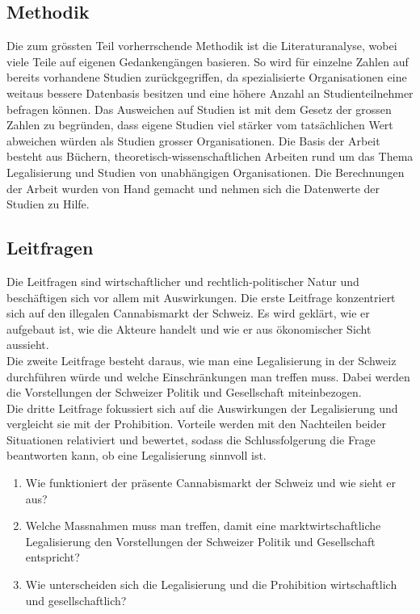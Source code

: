 \documentclass[../main.tex]{subfiles}
\begin{document}
	 
	 \subsection{Methodik}
	 Die zum grössten Teil vorherrschende Methodik ist die Literaturanalyse, wobei viele Teile auf eigenen Gedankengängen basieren. 
	 So wird für einzelne Zahlen auf bereits vorhandene Studien zurückgegriffen, da spezialisierte Organisationen eine weitaus bessere Datenbasis besitzen und eine höhere Anzahl an Studienteilnehmer befragen können. 
	 Das Ausweichen auf Studien ist mit dem Gesetz der grossen Zahlen zu begründen, dass eigene Studien viel stärker vom tatsächlichen Wert abweichen würden als Studien grosser Organisationen.
	 Die Basis der Arbeit besteht aus Büchern, theoretisch-wissenschaftlichen Arbeiten rund um das Thema Legalisierung und Studien von unabhängigen Organisationen.
	 Die Berechnungen der Arbeit wurden von Hand gemacht und nehmen sich die Datenwerte der Studien zu Hilfe.
	 
	 \subsection{Leitfragen}
	 Die Leitfragen sind wirtschaftlicher und rechtlich-politischer Natur und beschäftigen sich vor allem mit Auswirkungen.
	 Die erste Leitfrage konzentriert sich auf den illegalen Cannabismarkt der Schweiz.
	 Es wird geklärt, wie er aufgebaut ist, wie die Akteure handelt und wie er aus ökonomischer Sicht aussieht.\\
	 
	 \noindent
	 Die zweite Leitfrage besteht daraus, wie man eine Legalisierung in der Schweiz durchführen würde und welche Einschränkungen man treffen muss.
	 Dabei werden die Vorstellungen der Schweizer Politik und Gesellschaft miteinbezogen.\\
	 
	 \noindent
	 Die dritte Leitfrage fokussiert sich auf die Auswirkungen der Legalisierung und vergleicht sie mit der Prohibition. 
	 Vorteile werden mit den Nachteilen beider Situationen relativiert und bewertet, sodass die Schlussfolgerung die Frage beantworten kann, ob eine Legalisierung sinnvoll ist.

	 
	 \begin{enumerate}
	 	\item Wie funktioniert der präsente Cannabismarkt der Schweiz und wie sieht er aus?
	 	 
	 	\item Welche Massnahmen muss man treffen, damit eine marktwirtschaftliche Legalisierung den Vorstellungen der Schweizer Politik und Gesellschaft entspricht?
	 
	 	\item Wie unterscheiden sich die Legalisierung und die Prohibition wirtschaftlich und gesellschaftlich?
	 \end{enumerate}
	
\end{document}
